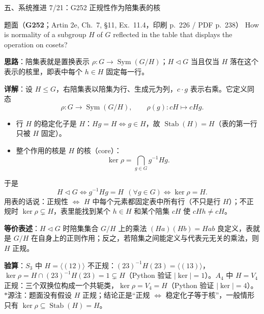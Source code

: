 \documentclass[aspectratio=169,10pt,fontset=none]{ctexbeamer}
\newcommand{\ex}[1]{\textcolor{accent}{\footnotesize\bfseries #1}}
\newcommand{\key}[1]{\textcolor{ink}{\bfseries #1}}
\newcommand{\starpt}{\textcolor{accent}{\bfseries$\ast$}}
\begin{document}
\begin{frame}[t]{五、系统推进 7/21：G252 正规性作为陪集表的核}
\label{ex:G252}
\scriptsize
\begin{block}{\footnotesize 题面（\ex{G252}；Artin 2e, Ch.~7, §11, Ex.~11.4，印刷 p.~226 / PDF p.~238）}
How is normality of a subgroup $H$ of $G$ reflected in the table that displays the operation on cosets?
\end{block}
\key{思路}：陪集表就是置换表示 $\rho:G\to\operatorname{Sym}(G/H)$；$H\triangleleft G$ 当且仅当 $H$ 落在这个表示的核里，即表中每个 $h\in H$ 固定每一行。

\key{详解}：设 $H\le G$，右陪集表以陪集为行、生成元为列，$c\cdot g$ 表示右乘。它定义同态
\[ \rho:G\longrightarrow\operatorname{Sym}(G/H),\qquad \rho(g):cH\longmapsto cHg. \]
\begin{itemize}
\item 行 $H$ 的稳定化子是 $H$：$H g=H\iff g\in H$，故 $\operatorname{Stab}(H)=H$（表的第一行只被 $H$ 固定）。
\item 整个作用的核是 $H$ 的核（core）：
\[ \ker\rho=\bigcap_{g\in G}g^{-1}Hg. \]
\end{itemize}
于是
\[ H\triangleleft G\iff g^{-1}Hg=H\ \ (\forall g\in G)\iff \ker\rho=H. \]
用表的话说：正规性 $\iff$ $H$ 中每个元素都固定表中所有行（不只是行 $H$）；不正规时 $\ker\rho\subsetneq H$，表里能找到某个 $h\in H$ 和某个陪集 $cH$ 使 $cHh\neq cH$。

\key{等价表述}：$H\triangleleft G$ 时陪集集合 $G/H$ 上的乘法 $(Ha)(Hb)=Hab$ 良定义，表就是 $G/H$ 在自身上的正则作用；反之，若陪集之间能定义与代表元无关的乘法，则 $H$ 正规。

\key{验算}：$S_3$ 中 $H=\langle(12)\rangle$ 不正规：$(23)^{-1}H(23)=\langle(13)\rangle$，$\ker\rho=H\cap(23)^{-1}H(23)=1\subsetneq H$（Python 验证 $|\ker|=1$）。$A_4$ 中 $H=V_4$ 正规：三个双换位构成一个共轭类，$\ker\rho=V_4=H$（Python 验证 $|\ker|=4$）。\starpt 源注：题面没有假设 $H$ 正规；结论正是“正规 $\iff$ 稳定化子等于核”，一般情形只有 $\ker\rho\subseteq\operatorname{Stab}(H)=H$。
\end{frame}

\end{document}
